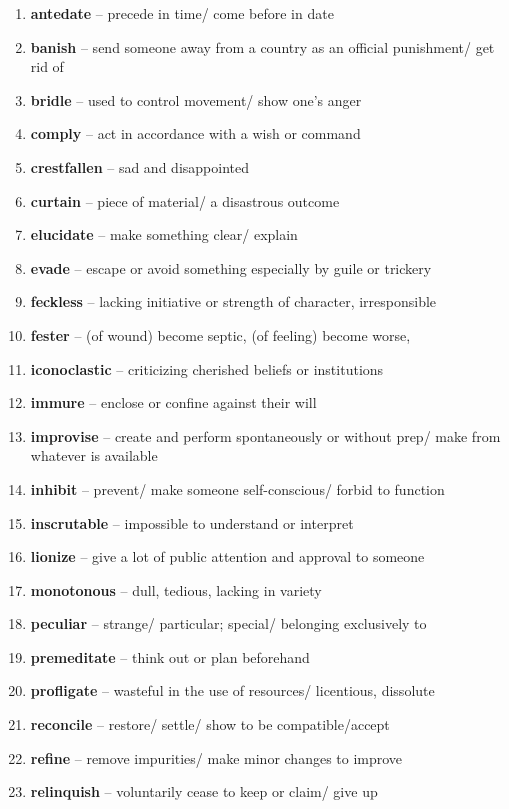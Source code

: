 \begin{enumerate}[wide,labelindent=0pt]
\item \textbf{antedate} -- precede in time/ come before in date
\item \textbf{banish} -- send someone away from a country as an official punishment/ get rid of
\item \textbf{bridle} -- used to control movement/ show one's anger
\item \textbf{comply} -- act in accordance with a wish or command
\item \textbf{crestfallen} -- sad and disappointed
\item \textbf{curtain} -- piece of material/ a disastrous outcome
\item \textbf{elucidate} -- make something clear/ explain
\item \textbf{evade} -- escape or avoid something especially by guile or trickery
\item \textbf{feckless} -- lacking initiative or strength of character, irresponsible
\item \textbf{fester} -- (of wound) become septic, (of feeling) become worse,
\item \textbf{iconoclastic} -- criticizing cherished beliefs or institutions
\item \textbf{immure} -- enclose or confine against their will
\item \textbf{improvise} -- create and perform spontaneously or without prep/ make from whatever is available
\item \textbf{inhibit} -- prevent/ make someone self-conscious/ forbid to function
\item \textbf{inscrutable} -- impossible to understand or interpret
\item \textbf{lionize} -- give a lot of public attention and approval to someone
\item \textbf{monotonous} -- dull, tedious, lacking in variety
\item \textbf{peculiar} -- strange/ particular; special/ belonging exclusively to
\item \textbf{premeditate} -- think out or plan beforehand
\item \textbf{profligate} -- wasteful in the use of resources/ licentious, dissolute
\item \textbf{reconcile} -- restore/ settle/ show to be compatible/accept
\item \textbf{refine} -- remove impurities/ make minor changes to improve
\item \textbf{relinquish} -- voluntarily cease to keep or claim/ give up

\end{enumerate}

